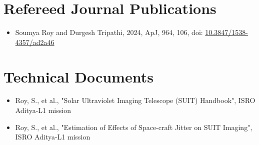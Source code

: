 \section*{Refereed Journal Publications}

\begin{itemize}
    \item Soumya Roy and Durgesh Tripathi, 2024, ApJ, 964, 106, doi: \href{https://iopscience.iop.org/article/10.3847/1538-4357/ad2a46}{10.3847/1538-4357/ad2a46}
\end{itemize}

\section*{Technical Documents}

\begin{itemize}
    \item Roy, S., et al., "Solar Ultraviolet Imaging Telescope (SUIT) Handbook", ISRO Aditya-L1 mission
    \item Roy, S., et al., "Estimation of Effects of Space-craft Jitter on SUIT Imaging", ISRO Aditya-L1 mission
\end{itemize}
